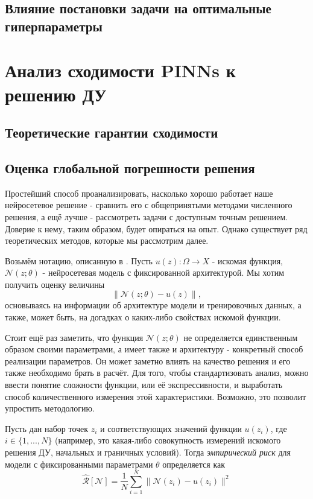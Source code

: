 \documentclass[a4paper, 12pt]{article}
\begin{document}
\subsection{Влияние постановки задачи на оптимальные гиперпараметры}

\section{Анализ сходимости PINNs к решению ДУ} \label{section:errorAnalysis}

\subsection{Теоретические гарантии сходимости}

\subsection{Оценка глобальной погрешности решения}

Простейший способ проанализировать, насколько хорошо работает наше нейросетевое решение - сравнить его с общепринятыми методами численного решения, а ещё лучше - рассмотреть задачи с доступным точным решением. Доверие к нему, таким образом, будет опираться на опыт. Однако существует ряд теоретических методов, которые мы рассмотрим далее.

Возьмём нотацию, описанную в \cite{Cuomo2022}. Пусть $u(z) : \Omega \to X$ - искомая функция, $\mathcal{N}(z; \theta)$ - нейросетевая модель с фиксированной архитектурой. Мы хотим получить оценку величины
$$
\|\mathcal{N}(z; \theta) - u(z)\|,
$$
основываясь на информации об архитектуре модели и тренировочных данных, а также, может быть, на догадках о каких-либо свойствах искомой функции. 

Стоит ещё раз заметить, что функция $\mathcal{N}(z; \theta)$ не определяется единственным образом своими параметрами, а имеет также и архитектуру - конкретный способ реализации параметров. Он может заметно влиять на качество решения и его также необходимо брать в расчёт. Для того, чтобы стандартизовать анализ, можно ввести понятие сложности функции, или её экспрессивности, и выработать способ количественного измерения этой характеристики. Возможно, это позволит упростить методологию.

Пусть дан набор точек $z_i$ и соответствующих значений функции $u(z_i)$, где $i \in \{1, ..., N\}$ (например, это какая-либо совокупность измерений искомого решения ДУ, начальных и граничных условий). Тогда \textit{эмпирический риск} для модели с фиксированными параметрами $\theta$ определяется как
$$
\mathcal{\hat{R}}[\mathcal{N}] = \frac{1}{N}\sum_{i=1}^{N}\|\mathcal{N}(z_i) - u(z_i)\|^2
$$
\end{document}
